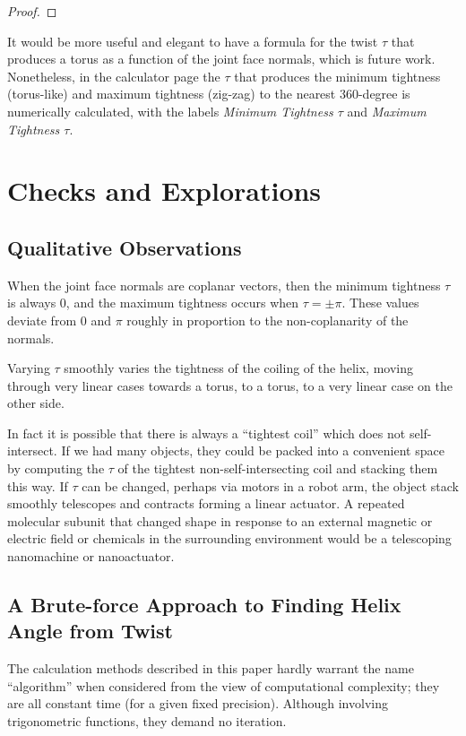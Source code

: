 \documentclass[11pt]{article}
\begin{document}
{\begin{proof}
\end{proof}


It would be more useful and elegant to have a formula for the twist $\tau$ that produces
a torus as a function of the joint face normals, which is future work.
Nonetheless, in the calculator page
the $\tau$ that produces the minimum tightness (torus-like) and maximum tightness (zig-zag) to the
nearest 360-degree is numerically calculated,
with the labels {\em Minimum Tightness $\tau$} and {\em Maximum Tightness $\tau$}.

\section{Checks and Explorations}

\subsection{Qualitative Observations}

When the joint face normals are coplanar vectors, then the minimum tightness $\tau$ is
always $0$, and the maximum tightness occurs when $\tau = \pm \pi$.
These values deviate from $0$ and $\pi$ roughly in proportion
to the non-coplanarity of the normals.

Varying $\tau$ smoothly varies the tightness of the coiling of the helix,
moving through very linear cases towards a torus,
to a torus, to a very linear case on the other side.

In fact it is possible that there is always a ``tightest coil''
which does not self-intersect. If we had many objects,
they could be packed into a convenient space by computing the $\tau$
of the tightest non-self-intersecting coil and stacking them this way.
If $\tau$ can be changed, perhaps via motors in a robot arm,
the object stack smoothly telescopes and contracts forming a
linear actuator.
A repeated molecular subunit that changed shape in
response to an external magnetic or electric field or chemicals in the surrounding
environment would be a telescoping nanomachine or nanoactuator.


\subsection{A Brute-force Approach to Finding Helix Angle from Twist}

The calculation methods described in this paper hardly warrant the name ``algorithm'' when considered from the view of computational complexity;
they are all constant time (for a given fixed precision).
Although involving trigonometric functions, they demand no iteration.

}
\end{document}
